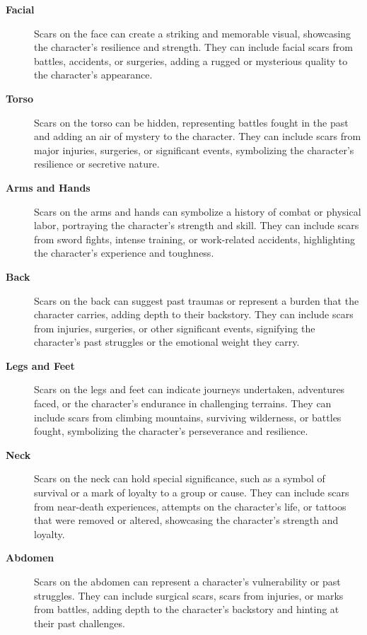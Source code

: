 \documentclass[12pt]{book}
\begin{document}
\begin{description}
    \item[\textbf{Facial}] Scars on the face can create a striking and memorable visual, showcasing the character's resilience and strength. They can include facial scars from battles, accidents, or surgeries, adding a rugged or mysterious quality to the character's appearance.
    
    \item[\textbf{Torso}] Scars on the torso can be hidden, representing battles fought in the past and adding an air of mystery to the character. They can include scars from major injuries, surgeries, or significant events, symbolizing the character's resilience or secretive nature.
    
    \item[\textbf{Arms and Hands}] Scars on the arms and hands can symbolize a history of combat or physical labor, portraying the character's strength and skill. They can include scars from sword fights, intense training, or work-related accidents, highlighting the character's experience and toughness.
    
    \item[\textbf{Back}] Scars on the back can suggest past traumas or represent a burden that the character carries, adding depth to their backstory. They can include scars from injuries, surgeries, or other significant events, signifying the character's past struggles or the emotional weight they carry.
    
    \item[\textbf{Legs and Feet}] Scars on the legs and feet can indicate journeys undertaken, adventures faced, or the character's endurance in challenging terrains. They can include scars from climbing mountains, surviving wilderness, or battles fought, symbolizing the character's perseverance and resilience.
    
    \item[\textbf{Neck}] Scars on the neck can hold special significance, such as a symbol of survival or a mark of loyalty to a group or cause. They can include scars from near-death experiences, attempts on the character's life, or tattoos that were removed or altered, showcasing the character's strength and loyalty.
    
    \item[\textbf{Abdomen}] Scars on the abdomen can represent a character's vulnerability or past struggles. They can include surgical scars, scars from injuries, or marks from battles, adding depth to the character's backstory and hinting at their past challenges.
\end{description}
\end{document}
